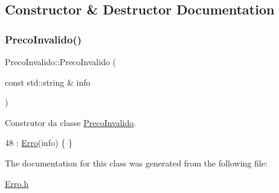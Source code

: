 \subsection{Constructor \& Destructor Documentation}
\mbox{\label{classPrecoInvalido_a596bb49295f1cd9454797a4db70b5b77}} 
\subsubsection{\texorpdfstring{Preco\+Invalido()}{PrecoInvalido()}}
{\footnotesize\ttfamily Preco\+Invalido\+::\+Preco\+Invalido (\begin{DoxyParamCaption}\item[{const std\+::string \&}]{info }\end{DoxyParamCaption})\hspace{0.3cm}{\ttfamily [inline]}}



Construtor da classe \hyperlink{classPrecoInvalido}{Preco\+Invalido}. 


\begin{DoxyCode}
48 : \hyperlink{classErro_a15d79796bd17517ff05d45eee55556f1}{Erro}(info) \{ \}
\end{DoxyCode}


The documentation for this class was generated from the following file\+:\begin{DoxyCompactItemize}
\item 
\hyperlink{Erro_8h}{Erro.\+h}\end{DoxyCompactItemize}
